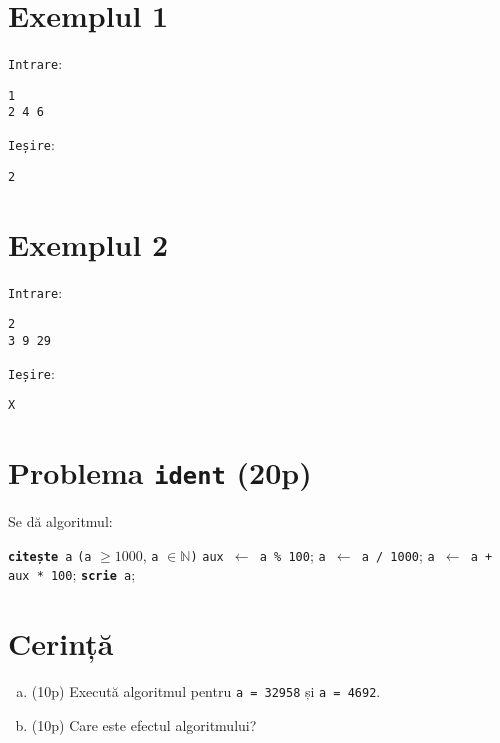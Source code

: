 \documentclass{scrartcl}
\begin{document}
{
\parindent0pt
    
\section*{Exemplul 1}
\texttt{Intrare}:
    \begin{lstlisting}
1
2 4 6
    \end{lstlisting}

\texttt{Ieșire}:
    \begin{lstlisting}
2
    \end{lstlisting}

\section*{Exemplul 2}
\texttt{Intrare}:
    \begin{lstlisting}
2
3 9 29
    \end{lstlisting}

\texttt{Ieșire}:
    \begin{lstlisting}
X
    \end{lstlisting}

}

\section*{Problema \texttt{ident} (20p)}
Se dă algoritmul:

\begin{algorithmic}[1]
    \State \texttt{\textbf{citește} a} \texttt{(a} $\geq 1000$, \texttt{a} $\in \mathbb{N}$\texttt{)}
    \State \texttt{aux $\gets$ a \% 100};
    \State \texttt{a $\gets$ a / 1000};
    \State \texttt{a $\gets$ a + aux * 100};
    \State \texttt{\textbf{scrie} a};
\end{algorithmic}

\section*{Cerință}
\begin{enumerate}[a)]
    \item (10p) Execută algoritmul pentru \texttt{a = 32958} și \texttt{a = 4692}.
    \item (10p) Care este efectul algoritmului?
\end{enumerate}    
\end{document}

